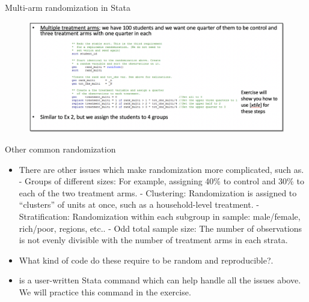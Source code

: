 \documentclass[aspectratio=169]{beamer}
\begin{document}
\begin{frame}{Multi-arm randomization in Stata}

\begin{figure}
	\centering
	\includegraphics[width=\linewidth]{img/Randomization11}
\end{figure}

\end{frame}


\begin{frame}{Other common randomization}
\begin{multicols}{2}	
	
	\begin{itemize}[<default overlay specification>]
		\item<1>  There are other issues which make randomization more complicated, such as.
			\newline - Groups of different sizes: For example, assigning 40\% to control and 30\% to each of the two treatment arms.
			\newline - Clustering: Randomization is assigned to “clusters” of units at once, such as a household-level treatment.
			\newline - Stratification: Randomization within each subgroup in sample: male/female, rich/poor, regions, etc..
			\newline - Odd total sample size: The number of observations is not evenly divisible with the number of treatment arms in each strata. 
		\item<1>  What kind of code do these require to be random and reproducible?.
		\item<1>  [randtreat] is a user-written Stata command which can help handle all the issues above. We will practice this command in the exercise.
	\end{itemize}
	
\end{multicols}
\end{frame}
\end{document}

